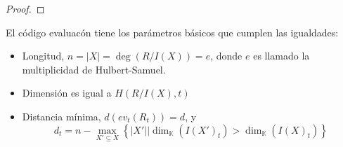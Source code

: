 \documentclass[12pt]{report}
\newcounter{it}
\theoremstyle{largebreak}
\newcommand\abs[1]{\ensuremath{\left|#1\right|}}
\begin{document}
    \begin{proof}
        
    \end{proof}

    \begin{propo}
        El código evaluacón tiene los parámetros básicos que cumplen las igualdades:
        \begin{itemize}
            \item Longitud, $n=\abs{X}=\deg\left(R/I(X) \right)=e$, donde $e$ es llamado la multiplicidad de Hulbert-Samuel.
            \item Dimensión es igual a $H(R/I(X),t)$
            \item Distancia mínima, $d(ev_t(R_t))=d$, y
            \begin{equation*}
                d_t=n-\max_{ X'\subseteq X}\left\{\abs{X'}\Big|\dim_{\mathbb{K}}(I(X')_t)>\dim_{\mathbb{K}}(I(X)_t) \right\}
            \end{equation*}
        \end{itemize}
    \end{propo}
\end{document}
